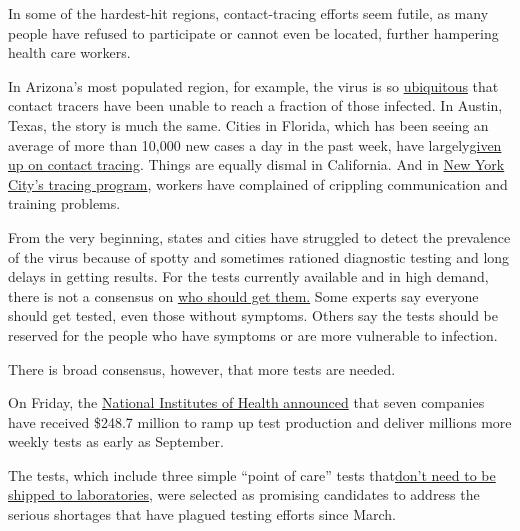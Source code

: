 In some of the hardest-hit regions, contact-tracing efforts seem futile,
as many people have refused to participate or cannot even be located,
further hampering health care workers.

In Arizona's most populated region, for example, the virus is so
\href{https://www.azfamily.com/news/continuing_coverage/coronavirus_coverage/contact-tracing-important-but-less-useful-with-spiking-cases-maricopa-county-says/article_57d55328-bb4b-11ea-8718-8b1cf4ab4137.html}{ubiquitous}
that contact tracers have been unable to reach a fraction of those
infected. In Austin, Texas, the story is much the same. Cities in
Florida, which has been seeing an average of more than 10,000 new cases
a day in the past week, have
largely\href{https://www.nbcmiami.com/news/local/miami-beach-mayor-urges-desantis-to-address-failures-of-floridas-contact-tracing-program/2268324/}{given
up on contact tracing}. Things are equally dismal in California. And in
\href{https://www.nytimes3xbfgragh.onion/2020/07/29/nyregion/new-york-contact-tracing.html}{New
York City's tracing program}, workers have complained of crippling
communication and training problems.

From the very beginning, states and cities have struggled to detect the
prevalence of the virus because of spotty and sometimes rationed
diagnostic testing and long delays in getting results. For the tests
currently available and in high demand, there is not a consensus on
\href{https://www.nytimes3xbfgragh.onion/2020/07/31/health/coronavirus-test-ethics.html}{who
should get them.} Some experts say everyone should get tested, even
those without symptoms. Others say the tests should be reserved for the
people who have symptoms or are more vulnerable to infection.

There is broad consensus, however, that more tests are needed.

On Friday, the
\href{https://www.nih.gov/news-events/news-releases/nih-delivering-new-covid-19-testing-technologies-meet-us-demand}{National
Institutes of Health announced} that seven companies have received
\$248.7 million to ramp up test production and deliver millions more
weekly tests as early as September.

The tests, which include three simple ``point of care'' tests
that\href{https://www.nytimes3xbfgragh.onion/2020/07/06/health/fast-coronavirus-tests.html}{don't
need to be shipped to laboratories}, were selected as promising
candidates to address the serious shortages that have plagued testing
efforts since March.

